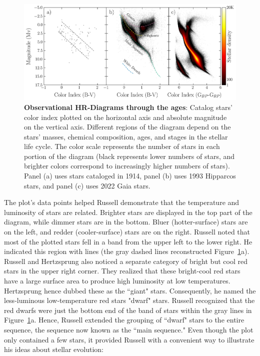\begin{figure}
\begin{center}
  \centerline{\includegraphics[width=1.2\linewidth]{figures/hr_diagram.png}}
  \caption{\textbf{Observational HR-Diagrams through the ages}: Catalog stars' color index plotted on the horizontal axis and absolute magnitude on the vertical axis. Different regions of the diagram depend on the stars' masses, chemical composition, ages, and stages in the stellar life cycle. The color scale represents the number of stars in each portion of the diagram (black represents lower numbers of stars, and brighter colors correspond to increasingly higher numbers of stars). Panel (a) uses stars cataloged in 1914, panel (b) uses 1993 Hipparcos stars, and panel (c) uses 2022 Gaia stars. 
 }
  \label{fig:HR-diagrams}
\end{center}
\end{figure}

The plot's data points helped Russell demonstrate that the temperature and luminosity of stars are related.
Brighter stars are displayed in the top part of the diagram, while dimmer stars are in the bottom. 
Bluer (hotter-surface) stars are on the left, and redder (cooler-surface) stars are on the right. 
Russell noted that most of the plotted stars fell in a band from the upper left to the lower right.
He indicated this region with lines (the gray dashed lines reconstructed Figure~\ref{fig:HR-diagrams}a).
Russell and Hertzsprung also noticed a separate category of bright but cool red stars in the upper right corner. 
They realized that these bright-cool red stars have a large surface area to produce high luminosity at low temperatures. 
Hertzsprung hence dubbed these as the ``giant" stars.  
Consequently, he named the less-luminous low-temperature red stars "dwarf" stars. 
Russell recognized that the red dwarfs were just the bottom end of the band of stars within the gray lines in Figure~\ref{fig:HR-diagrams}a. 
Hence, Russell extended the grouping of ``dwarf" stars to the entire sequence, the sequence now known as the ``main sequence."
Even though the plot only contained a few stars, it provided Russell with a convenient way to illustrate his ideas about stellar evolution:

